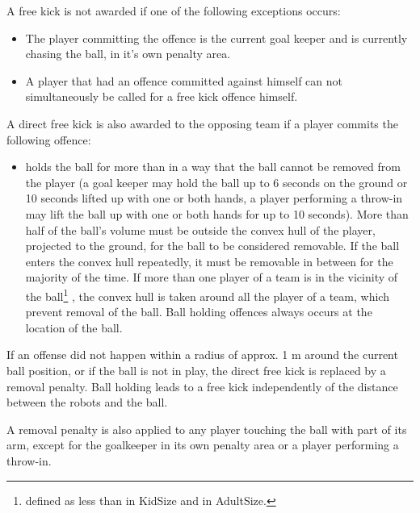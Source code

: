 A free kick is not awarded if one of the following exceptions occurs:
\begin{itemize}
    \item The player committing the offence is the current goal keeper and is currently chasing the ball, in it's own penalty area.
  \item A player that had an offence committed against himself can not simultaneously be called for a free kick offence himself.
\end{itemize}

\bigskip


A direct free kick is also awarded to the opposing team if a player commits
the following offence:

\begin{itemize}
  \item {}holds the ball for more than   in a way that the
  ball cannot be removed from the player (a goal keeper may hold the ball up to
  6 seconds on the ground or 10 seconds lifted up with one or both hands,
    a player performing a throw-in may lift the ball up with one or both hands
    for up to 10 seconds). More than half of the ball's volume must be outside
  the convex hull of the player, projected to the ground, for the ball to be
  considered removable. If the ball enters the convex hull repeatedly, it must
  be removable in between for the majority of the time. If more than one player
  of a team is in the vicinity of the ball\footnote{
    defined as less than   in KidSize and   in AdultSize.}
  , the convex hull is taken around all
  the player of a team, which prevent removal of the ball.
  Ball holding offences always occurs at the location of the ball.
\end{itemize}

\bigskip

If an offense did not happen within a radius of approx. 1 m
around the current ball position, or if the ball is not in play,
the direct free kick is replaced by a removal penalty.
Ball holding leads to a free kick independently of the distance between
the robots and the ball.

\bigskip

A removal penalty is also applied to any player touching the ball with
part of its arm, except for the goalkeeper in its own penalty area or a player
performing a throw-in.


\bigskip


